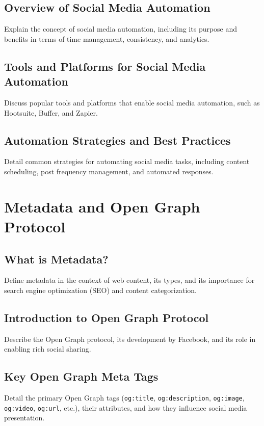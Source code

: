 \subsection{Overview of Social Media Automation}
\label{subsec:overview_of_social_media_automation}
Explain the concept of social media automation, including its purpose and benefits in terms of time management, consistency, and analytics.

\subsection{Tools and Platforms for Social Media Automation}
\label{subsec:tools_and_platforms_for_social_media_automation}
Discuss popular tools and platforms that enable social media automation, such as Hootsuite, Buffer, and Zapier.

\subsection{Automation Strategies and Best Practices}
\label{subsec:automation_strategies_and_best_practices}
Detail common strategies for automating social media tasks, including content scheduling, post frequency management, and automated responses.

\section{Metadata and Open Graph Protocol}
\label{sec:metadata_open_graph}

\subsection{What is Metadata?}
\label{subsec:what_is_metadata}
Define metadata in the context of web content, its types, and its importance for search engine optimization (SEO) and content categorization.

\subsection{Introduction to Open Graph Protocol}
\label{subsec:introduction_to_open_graph_protocol}
Describe the Open Graph protocol, its development by Facebook, and its role in enabling rich social sharing.

\subsection{Key Open Graph Meta Tags}
\label{subsec:key_open_graph_meta_tags}
Detail the primary Open Graph tags (\texttt{og:title}, \texttt{og:description}, \texttt{og:image}, \texttt{og:video}, \texttt{og:url}, etc.), their attributes, and how they influence social media presentation.

